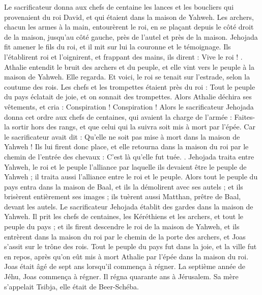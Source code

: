 \begin{multicols}{2}
Le sacrificateur donna aux chefs de centaine les lances et les boucliers qui provenaient du roi David, et qui étaient dans la maison de Yahweh.
Les archers, chacun les armes à la main, entourèrent le roi, en se plaçant depuis le côté droit de la maison, jusqu'au côté gauche, près de l'autel et près de la maison.
Jehojada fit amener le fils du roi, et il mit sur lui la couronne et le témoignage. Ils l'établirent roi et l'oignirent, et frappant des mains, ils dirent : Vive le roi !
.
Athalie entendit le bruit des archers et du peuple, et elle vint vers le peuple à la maison de Yahweh.
Elle regarda. Et voici, le roi se tenait sur l'estrade, selon la coutume des rois. Les chefs et les trompettes étaient près du roi : Tout le peuple du pays éclatait de joie, et on sonnait des trompettes. Alors Athalie déchira ses vêtements, et cria : Conspiration ! Conspiration !
Alors le sacrificateur Jehojada donna cet ordre aux chefs de centaines, qui avaient la charge de l'armée : Faites-la sortir hors des rangs, et que celui qui la suivra soit mis à mort par l'épée. Car le sacrificateur avait dit : Qu'elle ne soit pas mise à mort dans la maison de Yahweh !
Ils lui firent donc place, et elle retourna dans la maison du roi par le chemin de l'entrée des chevaux : C'est là qu'elle fut tuée.
.
Jehojada traita entre Yahweh, le roi et le peuple l'alliance par laquelle ils devaient être le peuple de Yahweh ; il traita aussi l'alliance entre le roi et le peuple.
Alors tout le peuple du pays entra dans la maison de Baal, et ils la démolirent avec ses autels ; et ils brisèrent entièrement ses images ; ils tuèrent aussi Matthan, prêtre de Baal, devant les autels. Le sacrificateur Jehojada établit des gardes dans la maison de Yahweh.
Il prit les chefs de centaines, les Kéréthiens et les archers, et tout le peuple du pays ; et ils firent descendre le roi de la maison de Yahweh, et ils entrèrent dans la maison du roi par le chemin de la porte des archers, et Joas s'assit sur le trône des rois.
Tout le peuple du pays fut dans la joie, et la ville fut en repos, après qu'on eût mis à mort Athalie par l'épée dans la maison du roi.
Joas était âgé de sept ans lorsqu'il commença à régner.
\VerseOne{}La septième année de Jéhu, Joas commença à régner. Il régna quarante ans à Jérusalem. Sa mère s'appelait Tsibja, elle était de Beer-Schéba.

\end{multicols}
